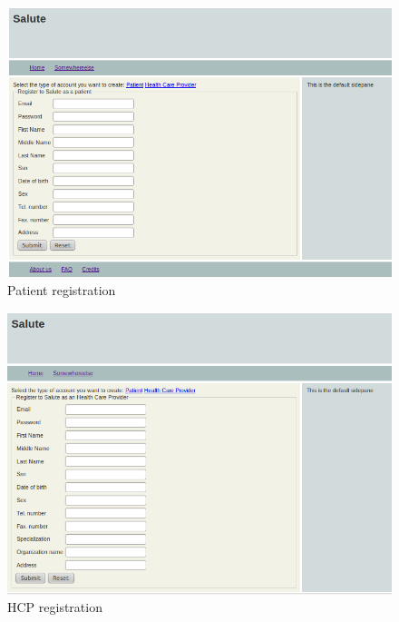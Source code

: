 \documentclass[10pt]{report}
\begin{document}
\begin{figure}
\includegraphics[scale=0.6]{screenshots/pat_register.png}
\caption{Patient registration}
\end{figure}

\begin{figure}
\includegraphics[scale=0.6]{screenshots/HCP_register.png}
\caption{HCP registration}
\end{figure}
\end{document}

